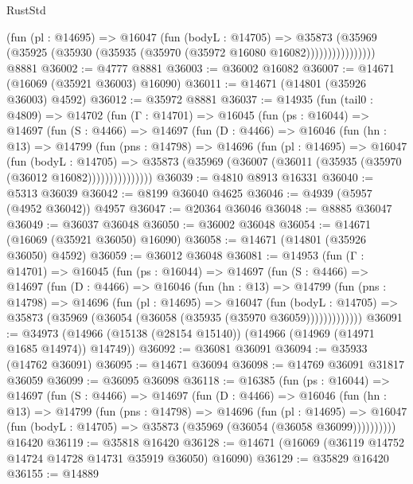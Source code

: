 \begin{lexlean}{RustStd}
\begin{coremodule}
                    (fun (pl : @14695) =>
                    @16047
                      (fun (bodyL : @14705) =>
                      @35873
                        (@35969
                          (@35925 (@35930 (@35935 (@35970 (@35972 @16080 @16082))))))))))))))))
    @8881
@36002 := @4777 @8881
@36003 := @36002 @16082
@36007 := @14671 (@16069 (@35921 @36003) @16090)
@36011 := @14671 (@14801 (@35926 @36003) @4592)
@36012 := @35972 @8881
@36037 := @14935
    (fun (tail0 : @4809) =>
    @14702
      (fun (Γ : @14701) =>
      @16045
        (fun (ps : @16044) =>
        @14697
          (fun (S : @4466) =>
          @14697
            (fun (D : @4466) =>
            @16046
              (fun (hn : @13) =>
              @14799
                (fun (pns : @14798) =>
                @14696
                  (fun (pl : @14695) =>
                  @16047
                    (fun (bodyL : @14705) =>
                    @35873 (@35969 (@36007 (@36011 (@35935 (@35970 (@36012 @16082)))))))))))))))
@36039 := @4810 @8913 @16331
@36040 := @5313 @36039
@36042 := @8199 @36040 @4625
@36046 := @4939 (@5957 (@4952 @36042)) @4957
@36047 := @20364 @36046
@36048 := @8885 @36047
@36049 := @36037 @36048
@36050 := @36002 @36048
@36054 := @14671 (@16069 (@35921 @36050) @16090)
@36058 := @14671 (@14801 (@35926 @36050) @4592)
@36059 := @36012 @36048
@36081 := @14953
    (fun (Γ : @14701) =>
    @16045
      (fun (ps : @16044) =>
      @14697
        (fun (S : @4466) =>
        @14697
          (fun (D : @4466) =>
          @16046
            (fun (hn : @13) =>
            @14799
              (fun (pns : @14798) =>
              @14696
                (fun (pl : @14695) =>
                @16047
                  (fun (bodyL : @14705) =>
                  @35873 (@35969 (@36054 (@36058 (@35935 (@35970 @36059)))))))))))))
@36091 := @34973 (@14966 (@15138 (@28154 @15140)) (@14966 (@14969 (@14971 @1685 @14974)) @14749))
@36092 := @36081 @36091
@36094 := @35933 (@14762 @36091)
@36095 := @14671 @36094
@36098 := @14769 @36091 @31817 @36059
@36099 := @36095 @36098
@36118 := @16385
    (fun (ps : @16044) =>
    @14697
      (fun (S : @4466) =>
      @14697
        (fun (D : @4466) =>
        @16046
          (fun (hn : @13) =>
          @14799
            (fun (pns : @14798) =>
            @14696
              (fun (pl : @14695) =>
              @16047 (fun (bodyL : @14705) => @35873 (@35969 (@36054 (@36058 @36099))))))))))
    @16420
@36119 := @35818 @16420
@36128 := @14671 (@16069 (@36119 @14752 @14724 @14728 @14731 @35919 @36050) @16090)
@36129 := @35829 @16420
@36155 := @14889

\end{coremodule}
\end{lexlean}
